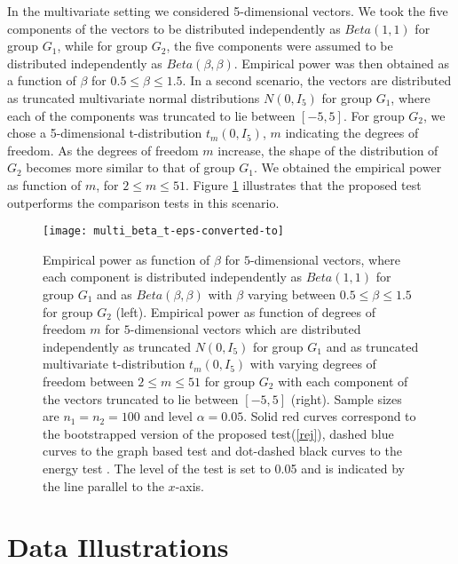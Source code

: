 \documentclass[lineno]{biometrika}
\def\cp{\citep}
\def\cp{\citep}
\begin{document}
In the multivariate setting we considered 5-dimensional vectors. We took the five components of the vectors to be distributed independently as $Beta(1,1)$ for group $G_1$, while  for group $G_2$, the  five components were assumed to be distributed independently as $Beta(\beta,\beta)$.  Empirical power was then obtained as a function of  $\beta$ for  $0.5 \leq \beta \leq 1.5$.  In a second  scenario, the vectors are distributed as truncated multivariate normal distributions $N(0,I_5)$ for group $G_1$,   where each of the components was truncated to lie between $[-5,5]$.  For group $G_2$, we chose  a 5-dimensional t-distribution $t_{m}(0,I_5)$,  $m$ indicating  the degrees of freedom. As the degrees of freedom $m$ increase, the shape of the distribution of $G_2$   becomes more similar to that of group $G_1$. We obtained the empirical  power  as function of  $m$, for  $2 \leq m \leq 51$. Figure \ref{fig:fig_7} illustrates  that  the proposed test outperforms the comparison tests in this scenario.
\begin{figure}
	\centering
	\texttt{[image: multi\_beta\_t-eps-converted-to]}
	\caption{Empirical  power as function of  $\beta$ for  $5$-dimensional vectors, where each component  is distributed independently as $Beta(1,1)$ for group $G_1$ and as $Beta(\beta,\beta)$ with $\beta$ varying between $0.5 \leq \beta \leq 1.5 $ for group $G_2$ (left). Empirical power as function  of degrees of freedom $m$ for  $5$-dimensional vectors which are distributed independently as truncated $N(0,I_5)$ for group $G_1$ and as truncated multivariate t-distribution $t_m(0,I_5)$ with varying degrees of freedom between $2 \leq m \leq 51$ for group $G_2$ with each component of the vectors truncated to lie between $[-5,5]$ (right).  Sample sizes are $n_1=n_2=100$ and level 
		$\alpha=0.05$. 
		Solid red curves correspond to the bootstrapped version of the  proposed test(\ref{rej}), dashed blue curves to the graph based test \cp{chen:16} and dot-dashed black curves to the energy test \cp{szek:04}. The level of the test is set to 0.05 and is indicated by the line parallel to the $x$-axis. }%
	\label{fig:fig_7}
\end{figure}

\section{Data Illustrations}
\label{sec: data}
\end{document}
